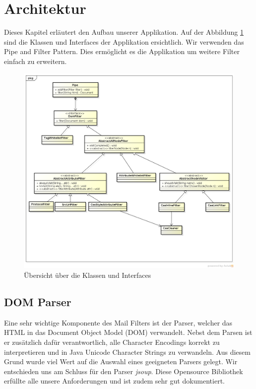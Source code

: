 \section{Architektur}

Dieses Kapitel erläutert den Aufbau unserer Applikation.
Auf der Abbildung \ref{fig:overview} sind die Klassen und Interfaces der Applikation ersichtlich.
Wir verwenden das Pipe and Filter Pattern. Dies ermöglicht es die Applikation um weitere Filter einfach zu erweitern. 

\begin{figure}[ht]
	\begin{center}
		\includegraphics[width=1.0\textwidth]{./content/Class_Overview.png}
	\end{center}
	\caption{Übersicht über die Klassen und Interfaces}
	\label{fig:overview}
\end{figure}

\subsection{DOM Parser}

Eine sehr wichtige Komponente des Mail Filters ist der Parser, welcher das HTML in das Document
Object Model (DOM) verwandelt. Nebst dem Parsen ist er zusätzlich dafür verantwortlich, alle Character
Encodings korrekt zu interpretieren und in Java Unicode Character Strings zu verwandeln. Aus diesem 
Grund wurde viel Wert auf die Auswahl eines geeigneten Parsers gelegt. Wir entschieden uns am Schluss 
für den Parser \textit{jsoup}\cite{DOM:JSOUP}. Diese Opensource Bibliothek erfüllte alle unsere 
Anforderungen und ist zudem sehr gut dokumentiert. 

